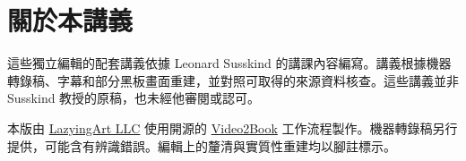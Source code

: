 \documentclass[11pt,oneside]{book}
\begin{document}
\frontmatter
\hypersetup{pageanchor=false}

\hypersetup{pageanchor=true}

\clearpage
\chapter*{關於本講義}
這些獨立編輯的配套講義依據 Leonard Susskind 的講課內容編寫。講義根據機器轉錄稿、字幕和部分黑板畫面重建，並對照可取得的來源資料核查。這些講義並非 Susskind 教授的原稿，也未經他審閱或認可。

本版由 \href{https://lazying.art}{LazyingArt LLC} 使用開源的 \href{https://github.com/lachlanchen/Video2Book}{Video2Book} 工作流程製作。機器轉錄稿另行提供，可能含有辨識錯誤。編輯上的釐清與實質性重建均以腳註標示。
\clearpage
\tableofcontents
\mainmatter










\end{document}
